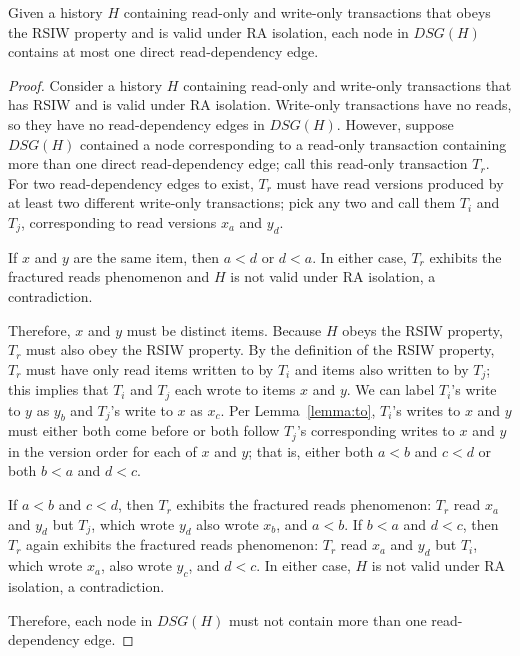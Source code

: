 \begin{lemma}
\label{lemma:onedep}
Given a history $H$ containing read-only and write-only transactions
that obeys the RSIW property and is valid under RA isolation, each
node in $DSG(H)$ contains at most one direct read-dependency edge.
\end{lemma}
\begin{proof}
  Consider a history $H$ containing read-only and write-only
  transactions that has RSIW and is valid under RA
  isolation. Write-only transactions have no reads, so they have no
  read-dependency edges in $DSG(H)$. However, suppose $DSG(H)$
  contained a node corresponding to a read-only transaction containing
  more than one direct read-dependency edge; call this read-only
  transaction $T_r$. For two read-dependency edges to exist, $T_r$
  must have read versions produced by at least two different
  write-only transactions; pick any two and call them $T_i$ and $T_j$,
  corresponding to read versions $x_a$ and $y_d$.

  If $x$ and $y$ are the same item, then $a < d$ or $d < a$. In either
  case, $T_r$ exhibits the fractured reads phenomenon and $H$ is not
  valid under RA isolation, a contradiction.

  Therefore, $x$ and $y$ must be distinct items. Because $H$ obeys the
  RSIW property, $T_r$ must also obey the RSIW property. By the
  definition of the RSIW property, $T_r$ must have only read items
  written to by $T_i$ and items also written to by $T_j$; this implies
  that $T_i$ and $T_j$ each wrote to items $x$ and $y$. We can label
  $T_i$'s write to $y$ as $y_b$ and $T_j$'s write to $x$ as $x_c$. Per
  Lemma~\ref{lemma:to}, $T_i$'s writes to $x$ and $y$ must either both
  come before or both follow $T_j$'s corresponding writes to $x$ and
  $y$ in the version order for each of $x$ and $y$; that is, either
  both $a < b$ and $c < d$ or both $b < a$ and $d < c$.

  If $a < b$ and $c < d$, then $T_r$ exhibits the fractured reads
  phenomenon: $T_r$ read $x_a$ and $y_d$ but $T_j$, which wrote $y_d$
  also wrote $x_b$, and $a < b$. If $b < a$ and $d < c$, then $T_r$
  again exhibits the fractured reads phenomenon: $T_r$ read $x_a$ and
  $y_d$ but $T_i$, which wrote $x_a$, also wrote $y_c$, and $d <
  c$. In either case, $H$ is not valid under RA isolation, a
  contradiction.

  Therefore, each node in $DSG(H)$ must not contain more than one
  read-dependency edge.
\end{proof}

